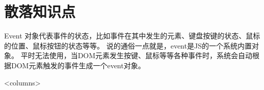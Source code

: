 \chapter{散落知识点}
Event 对象代表事件的状态，比如事件在其中发生的元素、键盘按键的状态、鼠标的位置、鼠标按钮的状态等等。 说的通俗一点就是，event是JS的一个系统内置对象。 平时无法使用，当DOM元素发生按键、鼠标等等各种事件时，系统会自动根据DOM元素触发的事件生成一个event对象。

\begin{table}[htbp]
	\centering\begin{tabular}{<columns>}
	\end{tabular}
	\caption{<caption>}
	\label{<label>}
\end{table}